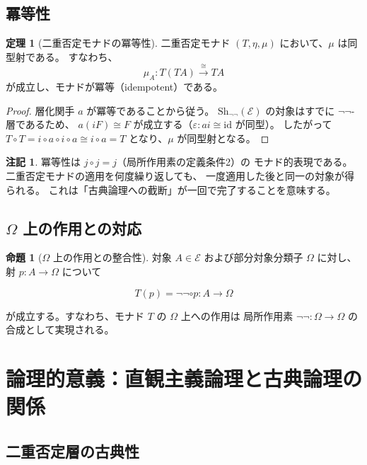 \documentclass[11pt,a4paper]{article}
\theoremstyle{definition}
\newtheorem{theorem}{定理}[section]
\newtheorem{proposition}{命題}[section]
\newtheorem{remark}{注記}[section]
\newcommand{\Sh}{\mathrm{Sh}_{\neg\neg}}
\newcommand{\topos}{\mathcal{E}}
\newcommand{\id}{\mathrm{id}}
\begin{document}
\subsection{冪等性}

\begin{theorem}[二重否定モナドの冪等性]
二重否定モナド $(T, \eta, \mu)$ において、$\mu$ は同型射である。
すなわち、
\[
\mu_A : T(TA) \xrightarrow{\;\cong\;} TA
\]
が成立し、モナドが冪等（idempotent）である。
\end{theorem}

\begin{proof}
層化関手 $a$ が冪等であることから従う。
$\Sh(\topos)$ の対象はすでに $\neg\neg$-層であるため、
$a(iF) \cong F$ が成立する（$\varepsilon: ai \cong \id$ が同型）。
したがって $T \circ T = i \circ a \circ i \circ a \cong i \circ a = T$
となり、$\mu$ が同型射となる。
\end{proof}

\begin{remark}
冪等性は $j \circ j = j$（局所作用素の定義条件2）の
モナド的表現である。
二重否定モナドの適用を何度繰り返しても、
一度適用した後と同一の対象が得られる。
これは「古典論理への截断」が一回で完了することを意味する。
\end{remark}

\subsection{\texorpdfstring{$\Omega$}{Omega} 上の作用との対応}

\begin{proposition}[\texorpdfstring{$\Omega$}{Omega} 上の作用との整合性]
対象 $A \in \topos$ および部分対象分類子 $\Omega$ に対し、
射 $p: A \to \Omega$ について

\[
T(p) = \neg\neg \circ p : A \to \Omega
\]

が成立する。すなわち、モナド $T$ の $\Omega$ 上への作用は
局所作用素 $\neg\neg: \Omega \to \Omega$ の合成として実現される。
\end{proposition}

\section{論理的意義：直観主義論理と古典論理の関係}

\subsection{二重否定層の古典性}
\end{document}
